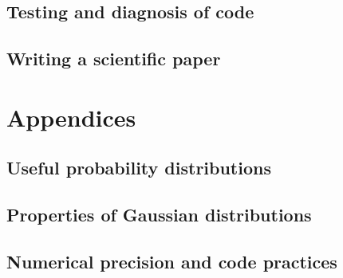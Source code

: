 \documentclass[10pt]{book}
\begin{document}
\chapter{Testing and diagnosis of code}

\chapter{Writing a scientific paper}

\appendix
\part*{Appendices}\markboth{}{}

\chapter{Useful probability distributions}

\chapter{Properties of Gaussian distributions}

\chapter{Numerical precision and code practices}
\end{document}
